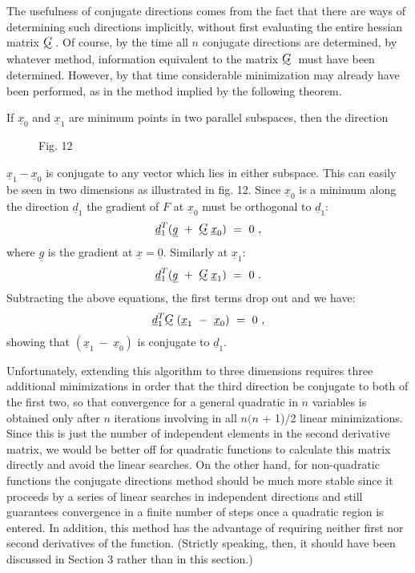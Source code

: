      The usefulness of conjugate directions comes from the fact that
there are ways of determining such directions implicitly, without first
evaluating the entire hessian matrix $\UTG$.  Of course, by the time all $n$
conjugate directions are determined, by whatever method, information
equivalent to the matrix $\UTG$ must have been determined.  However, by that
time considerable minimization may already have been performed, as in
the method implied by the following theorem.
 
If ${\underline{x}}_0$ and ${\underline{x}}_1$ are minimum points in two parallel subspaces, then
the direction 
\begin{figure}
\begin{center}\mbox{}\end{center}
 
\begin{center}
Fig. 12
\end{center}
\end{figure}
${\underline{x}}_1-{\underline{x}}_0$
is conjugate to any vector which lies in either
 subspace. This can easily be seen in
two dimensions as illustrated
in  fig. 12. Since ${\underline{x}}_0$
 is a minimum along the direction ${\underline{d}}_1$
 the gradient of $F$ at ${\underline{x}}_0$ must be
 orthogonal to ${\underline{d}}_1$:
$${\underline{d}}^T_1({\underline{g}}~+~\UTG
{\underline{x}}_0)~=~0~,$$ 
where ${\underline{g}}$ is the gradient at ${\underline{x}} = {\underline{0}}$.  
Similarly at ${\underline{x}}_1$:
$${\underline{d}}^T_1({\underline{g}}~+~\UTG
{\underline{x}}_1)~=~0~.$$
Subtracting the above equations, the first terms drop out and we have:
 $${\underline{d}}^T_1 \UTG({\underline{x}}_1~-~{\underline{x}}_0)~=~0~,$$
showing that $({\underline{x}}_1~-~{\underline{x}}_0)$ is conjugate to ${\underline{d}}_1$.
 
     Unfortunately, extending this algorithm to three dimensions requires
three additional minimizations in order that the third direction be
conjugate to both of the first two, so that convergence for a general
quadratic in $n$ variables is obtained only after $n$ iterations involving in
all $n(n$ + 1)/2 linear minimizations.  Since this is just the number of
independent elements in the second derivative matrix, we would be better
off for quadratic functions to calculate this matrix directly and avoid
the linear searches.  On the other hand, for non-quadratic functions the
conjugate directions method should be much more stable since it proceeds
by a series of linear searches in independent directions and still
guarantees convergence in a finite number of steps once a quadratic
region is entered.  In addition, this method has the advantage of
requiring neither first nor second derivatives of the function.
(Strictly speaking, then, it should have been discussed in Section 3
rather than in this section.)
 
